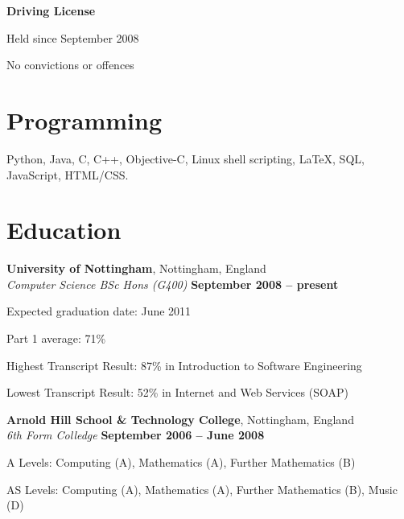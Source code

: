 \documentclass[margin,line]{resume}
\begin{document}
\begin{resume}
    \textbf{Driving License}\vspace{-2mm}\\%
    \begin{list2}
		\item Held since September 2008
		\item No convictions or offences
    \end{list2}
    
    \section{\mysidestyle Programming}

    Python, Java, C, C++, Objective-C, Linux shell scripting, \LaTeX, SQL, JavaScript, HTML/CSS.


    \section{\mysidestyle Education}

    \textbf{University of Nottingham}, Nottingham, England \vspace{2mm}\\\vspace{1mm}%
    \textsl{Computer Science BSc Hons (G400)} \hfill \textbf{September 2008 -- present}\vspace{-3mm}\\\vspace{-1mm}%
    \begin{list2}
        \item Expected graduation date: June 2011%
        \item Part 1 average: 71\%
        \item Highest Transcript Result: 87\% in Introduction to Software Engineering
        \item Lowest Transcript Result: 52\% in Internet and Web Services (SOAP)
    \end{list2}\vspace{-1.5mm}
    
    \textbf{Arnold Hill School \& Technology College}, Nottingham, England \vspace{2mm}\\\vspace{1mm}%
    \textsl{6th Form Colledge} \hfill \textbf{September 2006 -- June 2008}\vspace{-3mm}\\\vspace{-1mm}%
    \begin{list2}
        \item A Levels: Computing (A), Mathematics (A), Further Mathematics (B)%
        \item AS Levels: Computing (A), Mathematics (A), Further Mathematics (B), Music (D)%
    \end{list2}\vspace{-1.5mm}



\end{resume}
\end{document}
